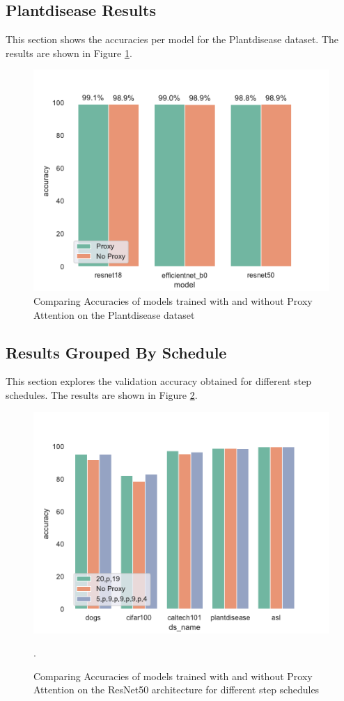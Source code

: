 \subsection{Plantdisease Results}
This section shows the accuracies per model for the Plantdisease dataset. The results are shown in Figure \ref{fig:plantdisease_results}. 
\begin{figure}[H]
    \centering
    \includegraphics[width=1\textwidth]{results/plantdisease_results.pdf}
    \caption{Comparing Accuracies of models trained with and without Proxy Attention on the Plantdisease dataset}
    \label{fig:plantdisease_results}
\end{figure}

\subsection{Results Grouped By Schedule}
This section explores the validation accuracy obtained for different step schedules. The results are shown in Figure \ref{fig:schedresnet50_results}. 
\begin{figure}[H]
    \centering
    \includegraphics[width=1\textwidth]{results/schedule_resnet50.pdf}
    \caption{Comparing Accuracies of models trained with and without Proxy Attention on the ResNet50 \cite{heDeepResidualLearning2016} architecture for different step schedules}.
    \label{fig:schedresnet50_results}
\end{figure}

